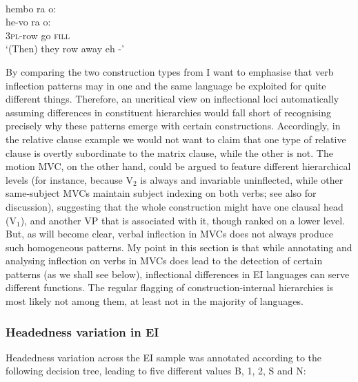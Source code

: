 \ea 
{}\\
\glll hembo ra o: \\
he-vo ra o: \\
3\textsc{pl}-row go \textsc{fill} \\
\glft `(Then) they row away eh -'\\ 
\z

By comparing the two construction types from  I want to emphasise that verb inflection patterns may in one and the same language be exploited for quite different things. Therefore, an uncritical view on inflectional loci automatically assuming differences in constituent hierarchies would fall short of recognising precisely why these patterns emerge with certain constructions. Accordingly, in the relative clause example we would not want to claim that one type of relative clause is overtly subordinate to the matrix clause, while the other is not. The motion MVC, on the other hand, could be argued to feature different hierarchical levels (for instance, because V$_2$ is always and invariable uninflected, while other same-subject MVCs maintain subject indexing on both verbs; see also  for discussion), suggesting that the whole construction might have one clausal head (V$_1$), and another VP that is associated with it, though ranked on a lower level. But, as will become clear, verbal inflection in MVCs does not always produce such homogeneous patterns. My point in this section is that while annotating and analysing inflection on verbs in MVCs does lead to the detection of certain patterns (as we shall see below), inflectional differences in EI languages can serve different functions. The regular flagging of construction-internal hierarchies is most likely not among them, at least not in the majority of languages.

\subsubsection{Headedness variation in EI}\label{sec:headednessEI}

Headedness variation across the EI sample was annotated according to the following decision tree, leading to five different values B, 1, 2, S and N:

